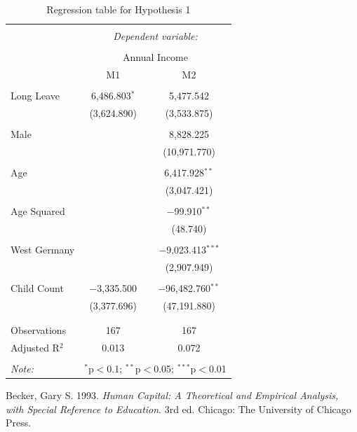 \documentclass[
  12pt,
]{article}
\begin{document}
\begin{table}[!htbp] \centering 
  \caption{Regression table for Hypothesis 1} 
  \label{tab2} 
\footnotesize 
\begin{tabular}{@{\extracolsep{-5pt}}lcc} 
\\[-1.8ex]\hline 
\hline \\[-1.8ex] 
 & \multicolumn{2}{c}{\textit{Dependent variable:}} \\ 
\cline{2-3} 
\\[-1.8ex] & \multicolumn{2}{c}{Annual Income} \\ 
 & M1 & M2 \\ 
\hline \\[-1.8ex] 
 Long Leave & 6,486.803$^{*}$ & 5,477.542 \\ 
  & (3,624.890) & (3,533.875) \\ 
  & & \\ 
 Male &  & 8,828.225 \\ 
  &  & (10,971.770) \\ 
  & & \\ 
 Age &  & 6,417.928$^{**}$ \\ 
  &  & (3,047.421) \\ 
  & & \\ 
 Age Squared &  & $-$99.910$^{**}$ \\ 
  &  & (48.740) \\ 
  & & \\ 
 West Germany &  & $-$9,023.413$^{***}$ \\ 
  &  & (2,907.949) \\ 
  & & \\ 
 Child Count & $-$3,335.500 & $-$96,482.760$^{**}$ \\ 
  & (3,377.696) & (47,191.880) \\ 
  & & \\ 
\hline \\[-1.8ex] 
Observations & 167 & 167 \\ 
Adjusted R$^{2}$ & 0.013 & 0.072 \\ 
\hline 
\hline \\[-1.8ex] 
\textit{Note:}  & \multicolumn{2}{r}{$^{*}$p$<$0.1; $^{**}$p$<$0.05; $^{***}$p$<$0.01} \\ 
\end{tabular} 
\end{table}

\hypertarget{refs}{}
\leavevmode\hypertarget{ref-becker_human_1993}{}%
Becker, Gary S. 1993. \emph{Human Capital: A Theoretical and Empirical Analysis, with Special Reference to Education}. 3rd ed. Chicago: The University of Chicago Press.
\end{document}
